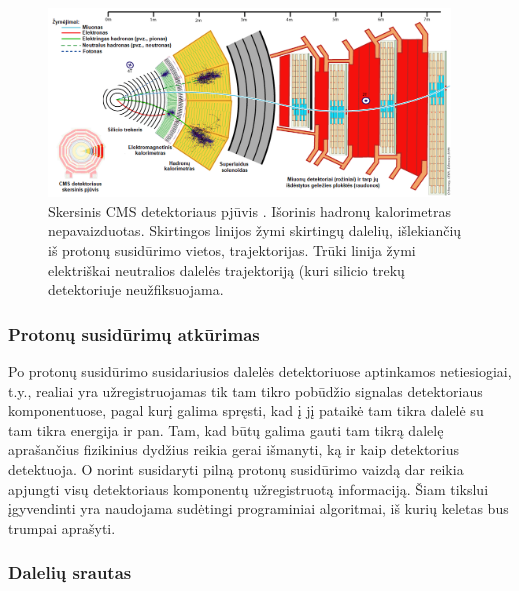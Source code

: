 \documentclass[a4paper, 12pt]{article}
\begin{document}
\begin{figure}[H] \centering
	\includegraphics[width=0.95\textwidth]{CMSslice_LT.png}
	\caption{\label{fig:CMSslice}Skersinis CMS detektoriaus pjūvis \cite{CMSslice}.
	Išorinis hadronų kalorimetras nepavaizduotas. Skirtingos linijos žymi skirtingų dalelių, išlekiančių
	iš protonų susidūrimo vietos, trajektorijas.
	Trūki linija žymi elektriškai neutralios dalelės trajektoriją (kuri silicio trekų detektoriuje
	neužfiksuojama.}
\end{figure}

\subsubsection{Protonų susidūrimų atkūrimas}\label{sec:ppReco}

Po protonų susidūrimo susidariusios dalelės detektoriuose aptinkamos netiesiogiai, t.y., realiai  yra
užregistruojamas tik tam tikro pobūdžio signalas detektoriaus komponentuose, pagal kurį galima spręsti,
kad į jį pataikė tam tikra dalelė su tam tikra energija ir pan.
Tam, kad būtų galima gauti tam tikrą dalelę aprašančius fizikinius dydžius reikia gerai išmanyti, ką
ir kaip detektorius detektuoja.
O norint susidaryti pilną protonų susidūrimo vaizdą dar reikia apjungti visų detektoriaus komponentų
užregistruotą informaciją.
Šiam tikslui įgyvendinti yra naudojama sudėtingi programiniai algoritmai, iš kurių keletas bus trumpai
aprašyti.


\subsubsection*{Dalelių srautas}
\end{document}
